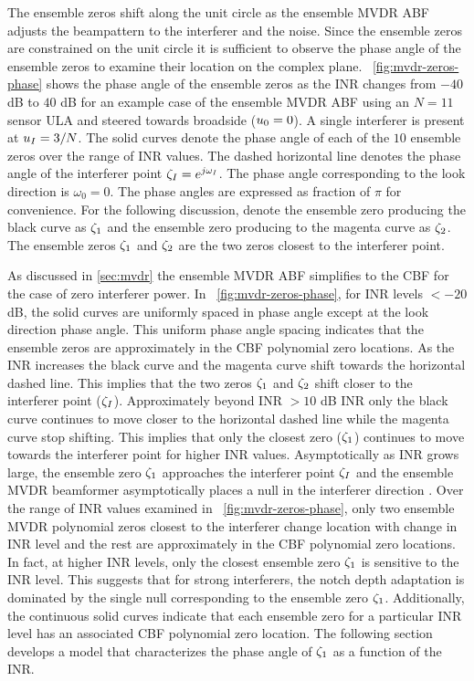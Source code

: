 The ensemble zeros shift along the unit circle as the ensemble MVDR
ABF adjusts the beampattern to the interferer and the noise. Since the
ensemble zeros are constrained on the unit circle it is sufficient to
observe the phase angle of the ensemble zeros to examine their
location on the complex
plane. \figurename{}~\ref{fig:mvdr-zeros-phase} shows the phase angle
of the ensemble zeros as the INR changes from $-40$ dB to $40$ dB for
an example case of the ensemble MVDR ABF using an $N = 11$ sensor ULA
and steered towards broadside ($u_0 = 0$). A single interferer is
present at $u_I = 3/N$. The solid curves denote the phase angle of
each of the $10$ ensemble zeros over the range of INR values. The
dashed horizontal line denotes the phase angle of the interferer point
$\zeta_I = e^{j\omega_I}$. The phase angle corresponding to the
look direction is $\omega_0 = 0$. The phase angles are expressed as
fraction of $\pi$ for convenience. For the following discussion,
denote the ensemble zero producing the black curve as $\zeta_1$ and
the ensemble zero producing to the magenta curve as $\zeta_2$. The
ensemble zeros $\zeta_1$ and $\zeta_2$ are the two zeros closest to
the interferer point.

As discussed in \sect{}\ref{sec:mvdr} the ensemble MVDR ABF simplifies
to the CBF for the case of zero interferer power. In
\figurename{}~\ref{fig:mvdr-zeros-phase}, for INR levels $< -20$ dB,
the solid curves are uniformly spaced in phase angle except at the
look direction phase angle. This uniform phase angle spacing indicates
that the ensemble zeros are approximately in the CBF polynomial zero
locations. As the INR increases the black curve and the magenta curve
shift towards the horizontal dashed line. This implies that the two
zeros $\zeta_1$ and $\zeta_2$ shift closer to the interferer point
($\zeta_I$). Approximately beyond INR $> 10$ dB INR only the black
curve continues to move closer to the horizontal dashed line while the
magenta curve stop shifting. This implies that only the closest zero
($\zeta_1$) continues to move towards the interferer point for higher
INR values. Asymptotically as INR grows large, the ensemble zero
$\zeta_1$ approaches the interferer point $\zeta_I$ and the ensemble
MVDR beamformer asymptotically places a null in the interferer
direction \cite{vtree2002oap}. Over the range of INR values examined
in \figurename{}~\ref{fig:mvdr-zeros-phase}, only two ensemble MVDR
polynomial zeros closest to the interferer change location with change
in INR level and the rest are approximately in the CBF polynomial zero
locations. In fact, at higher INR levels, only the closest ensemble
zero $\zeta_1$ is sensitive to the INR level. This suggests that for
strong interferers, the notch depth adaptation is dominated by the
single null corresponding to the ensemble zero
$\zeta_1$. Additionally, the continuous solid curves indicate that
each ensemble zero for a particular INR level has an associated CBF
polynomial zero location. The following section develops a model that
characterizes the phase angle of $\zeta_1$ as a function of the INR.

